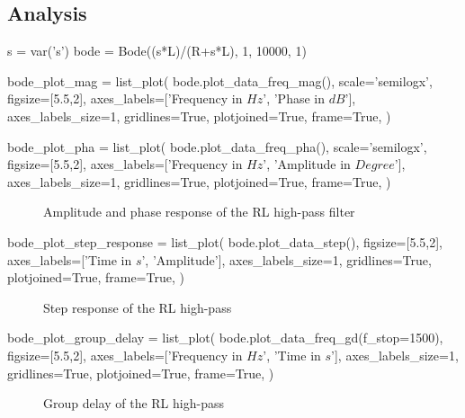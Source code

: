 \subsection{Analysis}

\begin{sagesilent}
    s = var('s')
    bode = Bode((s*L)/(R+s*L), 1, 10000, 1)

    bode_plot_mag = list_plot(
        bode.plot_data_freq_mag(),
        scale='semilogx',
        figsize=[5.5,2],
        axes_labels=['Frequency in $Hz$', 'Phase in $dB$'],
        axes_labels_size=1,
        gridlines=True,
        plotjoined=True,
        frame=True,
    )

    bode_plot_pha = list_plot(
        bode.plot_data_freq_pha(),
        scale='semilogx',
        figsize=[5.5,2],
        axes_labels=['Frequency in $Hz$', 'Amplitude in $Degree$'],
        axes_labels_size=1,
        gridlines=True,
        plotjoined=True,
        frame=True,
    )
\end{sagesilent}

\begin{figure}[H]
    \centering
    \begin{subfigure}{\textwidth}
        \centering
    \end{subfigure}
    \quad
    \begin{subfigure}{\textwidth}
        \centering
    \end{subfigure}
    \caption{Amplitude and phase response of the RL high-pass filter}
\end{figure}

\begin{sagesilent}
    bode_plot_step_response = list_plot(
        bode.plot_data_step(),
        figsize=[5.5,2],
        axes_labels=['Time in $s$', 'Amplitude'],
        axes_labels_size=1,
        gridlines=True,
        plotjoined=True,
        frame=True,
    )
\end{sagesilent}

\begin{figure}[H]
    \centering
    \caption{Step response of the RL high-pass}
\end{figure}

\begin{sagesilent}
    bode_plot_group_delay = list_plot(
        bode.plot_data_freq_gd(f_stop=1500),
        figsize=[5.5,2],
        axes_labels=['Frequency in $Hz$', 'Time in $s$'],
        axes_labels_size=1,
        gridlines=True,
        plotjoined=True,
        frame=True,
    )
\end{sagesilent}

\begin{figure}[H]
    \centering
    \caption{Group delay of the RL high-pass}
\end{figure}